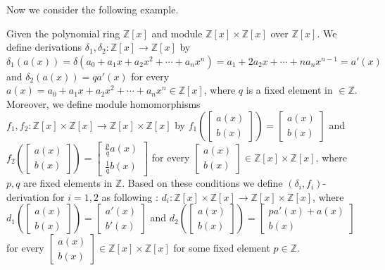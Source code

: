 \documentclass{arxiv}
\begin{document}
Now we consider the following example. 
\begin{example}\label{example2.1}
    Given the polynomial ring $\mathbb{Z}[x]$ and module  $\mathbb{Z}[x] \times \mathbb{Z}[x]$ over $\mathbb{Z}[x]$. We define derivations $\delta_1,\delta_2:\mathbb{Z}[x] \rightarrow \mathbb{Z}[x]$ by $\delta_1(a(x))=\delta(a_0+a_1x+a_2x^2+\cdots +a_nx^n)=a_1+2a_2x+\cdots+na_nx^{n-1}=a'(x)$ and $\delta_2(a(x))=qa'(x)$ for every $a(x)=a_0+a_1x+a_2x^2+\cdots+a_nx^n \in \mathbb{Z}[x]$, where $q$ is a fixed element in $ \in \mathbb{Z}$. Moreover, we define module homomorphisms $f_1,f_2:\mathbb{Z}[x] \times \mathbb{Z}[x] \rightarrow \mathbb{Z}[x] \times \mathbb{Z}[x]$ by $f_1 \left( \begin{bmatrix}
        a(x)\\
        b(x)
    \end{bmatrix} \right) = \begin{bmatrix}
        a(x)\\
        b(x)
    \end{bmatrix}$ and $f_2 \left( \begin{bmatrix}
        a(x)\\
        b(x)
    \end{bmatrix} \right) =\begin{bmatrix}
        \frac{p}{q} a(x)\\
        \frac{1}{q} b(x)
    \end{bmatrix}$ for every $\begin{bmatrix}
        a(x)\\
        b(x)
    \end{bmatrix} \in \mathbb{Z}[x] \times \mathbb{Z}[x]$, where $p,q$ are fixed elements in $ \mathbb{Z}$. Based on these conditions we define $(\delta_i,f_i)$-derivation for $i=1,2$ as following : $d_i : \mathbb{Z}[x] \times \mathbb{Z}[x] \rightarrow \mathbb{Z}[x] \times \mathbb{Z}[x]$, where $d_1 \left( \begin{bmatrix}
        a(x)\\
        b(x)
    \end{bmatrix} \right) = \begin{bmatrix}
        a'(x)\\
        b'(x)
    \end{bmatrix}$ and $d_2 \left( \begin{bmatrix}
        a(x)\\
        b(x)
    \end{bmatrix} \right) = \begin{bmatrix}
        pa'(x) + a(x)\\
        b(x)
    \end{bmatrix}$ for every $\begin{bmatrix}
        a(x)\\
        b(x)
    \end{bmatrix} \in \mathbb{Z}[x] \times \mathbb{Z}[x]$ for some fixed element $p \in \mathbb{Z}$. 
    

\end{example}
\end{document}
